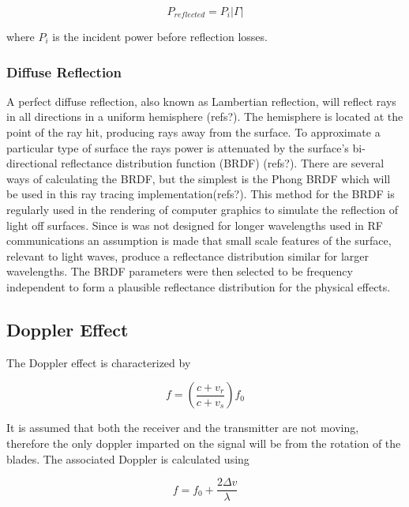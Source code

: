 \begin{equation}
	P_{reflected} = P_i|\Gamma|
	\label{eqn:reflected_power}
\end{equation}

where $P_i$ is the incident power before reflection losses.

\subsubsection{Diffuse Reflection}
A perfect diffuse reflection, also known as Lambertian reflection, will reflect rays in all directions in a uniform hemisphere (refs?). The hemisphere is located at the point of the ray hit, producing rays away from the surface. To approximate a particular type of surface the rays power is attenuated by the surface's bi-directional reflectance distribution function (BRDF) (refs?). There are several ways of calculating the BRDF, but the simplest is the Phong BRDF which will be used in this ray tracing implementation(refs?). This method for the BRDF is regularly used in the rendering of computer graphics to simulate the reflection of light off surfaces. Since is was not designed for longer wavelengths used in RF communications an assumption is made that small scale features of the surface, relevant to light waves,  produce a reflectance distribution similar for larger wavelengths. The BRDF parameters were then selected to be frequency independent to form a plausible reflectance distribution for the physical effects.


\subsection{Doppler Effect}
The Doppler effect is characterized by

\begin{equation}
	f = \left ( \frac{c + v_r}{c + v_s} \right ) f_0
	\label{eqn:formalDop}
\end{equation}

It is assumed that both the receiver and the transmitter are not moving, therefore the only doppler imparted on the signal will be from the rotation of the blades. The associated Doppler is calculated using

\begin{equation}
	f = f_0 + \frac{2\Delta v}{\lambda} %
	\label{eqn:observedShift}	
\end{equation}

